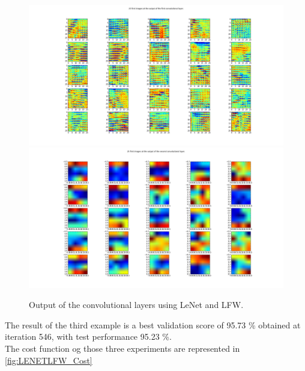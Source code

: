 \begin{figure}[htb]
\centering
\includegraphics[width=1.4\textwidth]{images/LFW_layers/conv_0_out.png}
\includegraphics[width=1.4\textwidth]{images/LFW_layers/conv_1_out.png}
\caption{Output of the convolutional layers using LeNet and LFW.} \label{fig:LENETLFW_ker4}
\end{figure}

The result of the third example is a best validation score of 95.73 \% obtained at iteration 546, with test performance 95.23 \%. \\


The cost function og those three experiments are represented in \ref{fig:LENETLFW_Cost}

